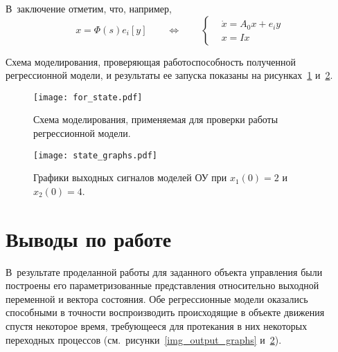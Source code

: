 В~заключение отметим, что, например,
\begin{equation}
    x = \Phi(s) e_i [y]
    \qquad
    \Leftrightarrow
    \qquad
    \left\{
    \begin{aligned}
        & \dot{x} = A_0 x + e_i y\\
        & x = I x
    \end{aligned}
    \right.
\end{equation}

Схема моделирования, проверяющая работоспособность полученной регрессионной модели, и результаты ее запуска показаны на рисунках~\ref{img_for_state} и~\ref{img_state_graphs}.

\begin{figure}[p]
    \centering
    \texttt{[image: for\_state.pdf]}
    \caption{Схема моделирования, применяемая для проверки работы регрессионной модели.}
    \label{img_for_state}
\end{figure}

\begin{figure}[p]
    \centering
    \texttt{[image: state\_graphs.pdf]}
    \caption{Графики выходных сигналов моделей ОУ при $x_1(0)=2$ и $x_2(0)=4$.}
    \label{img_state_graphs}
\end{figure}


\section{Выводы по работе}
В~результате проделанной работы для заданного объекта управления были построены его параметризованные представления относительно выходной переменной и вектора состояния.
Обе регрессионные модели оказались способными в точности воспроизводить происходящие в объекте движения спустя некоторое время, требующееся для протекания в них некоторых переходных процессов (см.~рисунки~\ref{img_output_graphs} и~\ref{img_state_graphs}).
